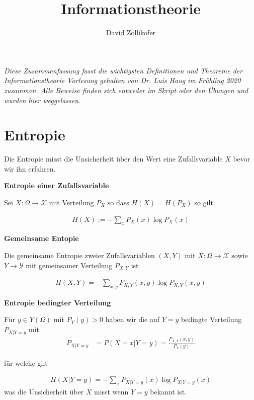 \documentclass[25pt]{sciposter}
\title{\huge{Informationstheorie}}
\author{\large{David Zollikofer}}
\newenvironment{defn}[1]{\begin{mdframed}[backgroundcolor=blue!10,innertopmargin=15pt, nobreak=true,innerbottommargin=15pt]
		\textbf{#1 }
	}
	{ 
	\end{mdframed}
}
\begin{document}
\maketitle



\begin{multicols}{3}



\textit{Diese Zusammenfassung fasst die wichtigsten Definitionen und Theoreme der Informationstheorie Vorlesung gehalten von Dr. Luis Haug im Frühling 2020 zusammen. Alle Beweise finden sich entweder im Skript oder den Übungen und wurden hier weggelassen.}


\section{Entropie}


Die Entropie misst die Unsicherheit über den Wert eine Zufallsvariable $X$ bevor wir ihn erfahren.

\begin{defn}{Entropie einer Zufallsvariable}
Sei $X:\Omega \to \mathcal{X}$ mit Verteilung $P_X$ so dass $H(X) = H(P_X)$ so gilt

\begin{align*}
	H(X) := - \sum_x P_X(x) \log P_X(x)
\end{align*}
\end{defn}

\begin{defn}{Gemeinsame Entopie}
Die gemeinsame Entropie zweier Zufallsvariablen $(X,Y)$ mit $X:\Omega \to \mathcal{X}$ sowie $Y\to \mathcal{Y}$ mit gemeinsamer Verteilung $P_{X,Y}$ ist

\begin{align*}
	H(X,Y) = - \sum_{x,y} P_{X,Y} (x,y) \log P_{X,Y} (x,y)
\end{align*}
\end{defn}

\begin{defn}{Entropie bedingter Verteilung}
	Für $y\in Y(\Omega)$ mit $P_Y(y) > 0$ haben wir die auf $Y=y$ bedingte Verteilung $P_{X|Y=y}$ mit 
	\begin{align*}
		P_{X|Y=y} &= P(X=x | Y = y) = \frac{P_{X,Y}(x,y)}{P_Y(y)}
	\end{align*}
	
	für welche gilt
	
	\begin{align*}
	H(X|Y=y) = - \sum_{x} P_{X|Y=y} (x) \log P_{X|Y=y} (x)
	\end{align*}
	was die Unsicherheit über $X$ misst wenn $Y=y$ bekannt ist.
\end{defn}


\end{multicols}
\end{document}
